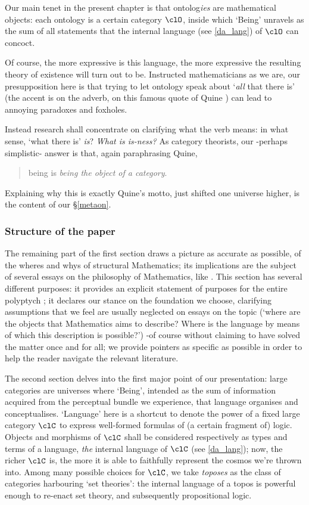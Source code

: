 Our main tenet in the present chapter is that ontolog\emph{ies} are mathematical objects: each ontology is a certain category $\clO$, inside which `Being' unravels as the sum of all statements that the internal language (see \ref{da_lang}) of $\clO$ can concoct.

Of course, the more expressive is this language, the more expressive the resulting theory of existence will turn out to be. Instructed mathematicians as we are, our presupposition here is that trying to let ontology speak about `\emph{all} that there is' (the accent is on the adverb, on this famous quote of Quine \cite{quine1948there}) can lead to annoying paradoxes and foxholes.

Instead research shall concentrate on clarifying what the verb means: in what sense, `what there is' \emph{is}? \emph{What is is-ness?} As category theorists, our -perhaps simplistic- answer is that, again paraphrasing Quine,
\begin{quote}
	being is \emph{being the object of a category}.
\end{quote}
Explaining why this is exactly Quine's motto, just shifted one universe higher, is the content of our §\ref{metaon}.
\subsubsection{Structure of the paper}
The remaining part of the first section draws a picture as accurate as possible, of the wheres and whys of structural Mathematics; its implications are the subject of several essays on the philosophy of Mathematics, like \cite{kromer2007tool,Marquis1997,marquis2010category,marquis2008geometrical}. This section has several different purposes: it provides an explicit statement of purposes for the entire polyptych \cite{black,homot}; it declares our stance on the foundation we choose, clarifying assumptions that we feel are usually neglected on essays on the topic (`where are the objects that Mathematics aims to describe? Where is the language by means of which this description is possible?') -of course without claiming to have solved the matter once and for all; we provide pointers as specific as possible in order to help the reader navigate the relevant literature.

The second section delves into the first major point of our presentation: large categories are universes where `Being', intended as the sum of information acquired from the perceptual bundle we experience, that language organises and conceptualises. `Language' here is a shortcut to denote the power of a fixed large category $\clC$ to express well-formed formulas of (a certain fragment of) logic. Objects and morphisms of $\clC$ shall be considered respectively as types and terms of a language, \emph{the} internal language of $\clC$ (see \autoref{da_lang}); now, the richer $\clC$ is, the more it is able to faithfully represent the cosmos we're thrown into. Among many possible choices for $\clC$, we take \emph{toposes} as the class of categories harbouring `set theories': the internal language of a topos is powerful enough to re-enact set theory, and subsequently propositional logic.

